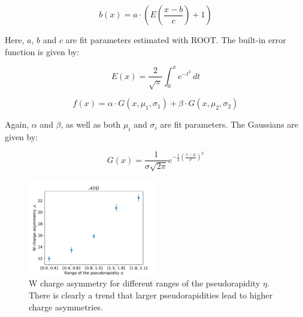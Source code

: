 \documentclass[%
 reprint,
 amsmath,amssymb,
 aps,
]{revtex4-2}
\begin{document}
\begin{equation}\label{eq:bkg_fit}
    b(x) = a \cdot \left( E \left(\frac{x - b}{c} \right) + 1 \right) 
\end{equation}

Here, $a$, $b$ and $c$ are fit parameters estimated with ROOT. The built-in error function is given by: 

\begin{equation}\label{eq:erf}
    E(x) = \frac{2}{\sqrt{\pi}} \int_0^x e^{-t^2} \, dt
\end{equation}

\begin{equation}\label{eq:fit}
    f(x) = \alpha \cdot G(x, \mu_1, \sigma_1) +  \beta \cdot G(x, \mu_2, \sigma_2)
\end{equation}

Again, $\alpha$ and $\beta$, as well as both $\mu_i$ and $\sigma_i$ are fit parameters. The Gaussians are given by:

\begin{equation}\label{eq:gaus}
    G(x) = \frac{1}{\sigma \sqrt{2 \pi}} e^{-\frac{1}{2} \left( \frac{x - \mu}{\sigma} \right)^2}
\end{equation}

\begin{figure}
    \centering
    \includegraphics[width=0.5\textwidth]{Plots/part2/A_eta.pdf}
    \caption{W charge asymmetry for different ranges of the pseudorapidity $\eta$. There is clearly a trend that larger pseudorapidities lead to higher charge asymmetries.}
    \label{fig:A_eta}
\end{figure}
\end{document}
